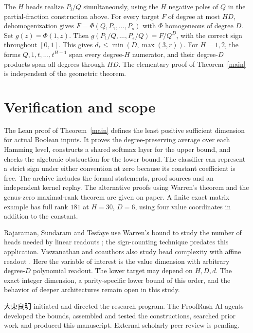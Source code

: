 \documentclass[11pt]{article}
\newcommand{\ds}{d_\ast}
\begin{document}
The $H$ heads realize $P_i/Q$ simultaneously, using the $H$ negative poles of $Q$ in the partial-fraction construction above. For every target $F$ of degree at most $HD$, dehomogenization gives $F=\Phi(Q,P_1,\ldots,P_s)$ with $\Phi$ homogeneous of degree $D$. Set $g(z)=\Phi(1,z)$. Then $g(P_1/Q,\ldots,P_s/Q)=F/Q^D$, with the correct sign throughout $[0,1]$. This gives $\ds\le\min(D,\max(3,r))$. For $H=1,2$, the forms $Q,1,t,\ldots,t^{H-1}$ span every degree-$H$ numerator, and their degree-$D$ products span all degrees through $HD$. The elementary proof of Theorem~\ref{main} is independent of the geometric theorem.

\section{Verification and scope}
The Lean proof of Theorem~\ref{main} defines the least positive sufficient dimension for actual Boolean inputs. It proves the degree-preserving average over each Hamming level, constructs a shared softmax layer for the upper bound, and checks the algebraic obstruction for the lower bound. The classifier can represent a strict sign under either convention at zero because its constant coefficient is free. The archive includes the formal statements, proof sources and an independent kernel replay. The alternative proofs using Warren's theorem and the genus-zero maximal-rank theorem are given on paper. A finite exact matrix example has full rank $181$ at $H=30$, $D=6$, using four value coordinates in addition to the constant.

Rajaraman, Sundaram and Tesfaye use Warren's bound to study the number of heads needed by linear readouts \cite{rajaraman}; the sign-counting technique predates this application. Viswanathan and coauthors also study head complexity with affine readout \cite{viswanathan}. Here the variable of interest is the value dimension with arbitrary degree-$D$ polynomial readout. The lower target may depend on $H,D,d$. The exact integer dimension, a parity-specific lower bound of this order, and the behavior of deeper architectures remain open in this study.

{\namefont 大束良明} initiated and directed the research program. The ProofRush AI agents developed the bounds, assembled and tested the constructions, searched prior work and produced this manuscript. External scholarly peer review is pending.
\end{document}
